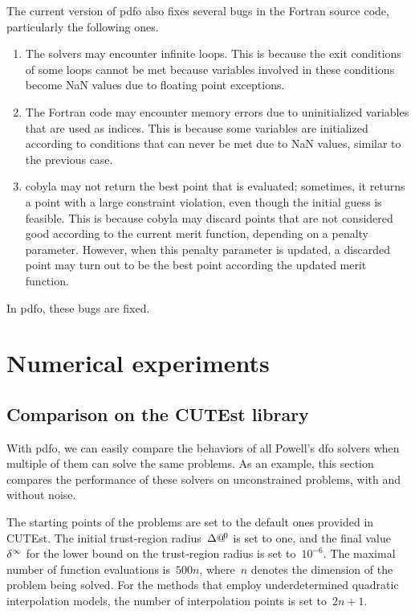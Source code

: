 The current version of \gls{pdfo} also fixes several bugs in the Fortran source code, particularly the following ones.
\begin{enumerate}
    \item The solvers may encounter infinite loops.
    This is because the exit conditions of some loops cannot be met because variables involved in these conditions become NaN values due to floating point exceptions.
    \item The Fortran code may encounter memory errors due to uninitialized variables that are used as indices.
    This is because some variables are initialized according to conditions that can never be met due to NaN values, similar to the previous case.
    \item \Gls{cobyla} may not return the best point that is evaluated; sometimes, it returns a point with a large constraint violation, even though the initial guess is feasible.
    This is because \gls{cobyla} may discard points that are not considered good according to the current merit function, depending on a penalty parameter.
    However, when this penalty parameter is updated, a discarded point may turn out to be the best point according the updated merit function.
\end{enumerate}
In \gls{pdfo}, these bugs are fixed.


\section{Numerical experiments}
\label{sec:pdfo-experiments}

\subsection{Comparison on the CUTEst library}

With \gls{pdfo}, we can easily compare the behaviors of all Powell's \gls{dfo} solvers when multiple of them can solve the same problems.
As an example, this section compares the performance of these solvers on unconstrained problems, with and without noise.

The starting points of the problems are set to the default ones provided in CUTEst.
The initial trust-region radius~$\rad[0]$ is set to one, and the final value~$\radlb[\infty]$ for the lower bound on the trust-region radius is set to~$10^{-6}$.
The maximal number of function evaluations is~$500n$, where~$n$ denotes the dimension of the problem being solved.
For the methods that employ underdetermined quadratic interpolation models, the number of interpolation points is set to~$2n + 1$.

